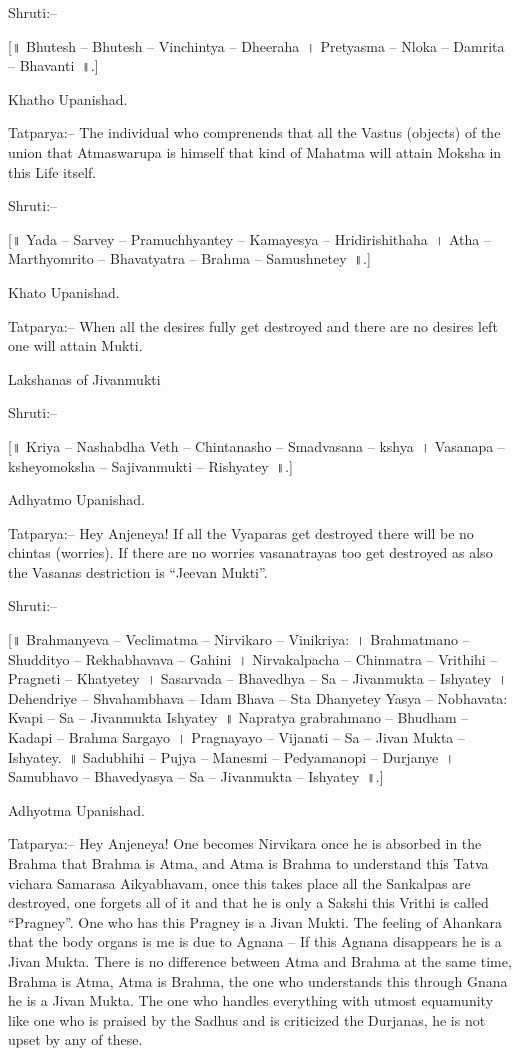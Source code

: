Shruti:–

[॥ Bhutesh – Bhutesh – Vinchintya – Dheeraha~। Pretyasma – Nloka – Damrita – Bhavanti~॥.]

Khatho Upanishad.

Tatparya:– The individual who comprenends that all the Vastus (objects) of the union that Atmaswarupa is himself that kind of Mahatma will attain Moksha in this Life itself.

Shruti:–

[॥ Yada – Sarvey – Pramuchhyantey – Kamayesya – Hridirishithaha~। Atha – Marthyomrito – Bhavatyatra – Brahma – Samushnetey~॥.]

Khato Upanishad.

Tatparya:– When all the desires fully get destroyed and there are no desires left one will attain Mukti.

Lakshanas of Jivanmukti

Shruti:–

[॥ Kriya – Nashabdha Veth – Chintanasho – Smadvasana – kshya~। Vasanapa – ksheyomoksha – Sajivanmukti – Rishyatey~॥.]

Adhyatmo Upanishad.

Tatparya:– Hey Anjeneya! If all the Vyaparas get destroyed there will be no chintas (worries). If there are no worries vasanatrayas too get destroyed as also the Vasanas destriction is “Jeevan Mukti”.

Shruti:–

[॥ Brahmanyeva – Veclimatma – Nirvikaro – Vinikriya:~। Brahmatmano – Shuddityo – Rekhabhavava – Gahini~। Nirvakalpacha – Chinmatra – Vrithihi – Pragneti – Khatyetey~। Sasarvada – Bhavedhya – Sa – Jivanmukta – Ishyatey~। Dehendriye – Shvahambhava – Idam Bhava – Sta Dhanyetey Yasya – Nobhavata: Kvapi – Sa – Jivanmukta Ishyatey~॥ Napratya grabrahmano – Bhudham – Kadapi – Brahma Sargayo~। Pragnayayo – Vijanati – Sa – Jivan Mukta – Ishyatey.~॥ Sadubhihi – Pujya – Manesmi – Pedyamanopi – Durjanye~। Samubhavo – Bhavedyasya – Sa – Jivanmukta – Ishyatey~॥.]

Adhyotma Upanishad.

Tatparya:– Hey Anjeneya! One becomes Nirvikara once he is absorbed in the Brahma that Brahma is Atma, and Atma is Brahma to understand this Tatva vichara Samarasa Aikyabhavam, once this takes place all the Sankalpas are destroyed, one forgets all of it and that he is only a Sakshi this Vrithi is called “Pragney”. One who has this Pragney is a Jivan Mukti. The feeling of Ahankara that the body organs is me is due to Agnana – If this Agnana disappears he is a Jivan Mukta. There is no difference between Atma and Brahma at the same time, Brahma is Atma, Atma is Brahma, the one who understands this through Gnana he is a Jivan Mukta. The one who handles everything with utmost equamunity like one who is praised by the Sadhus and is criticized the Durjanas, he is not upset by any of these.


